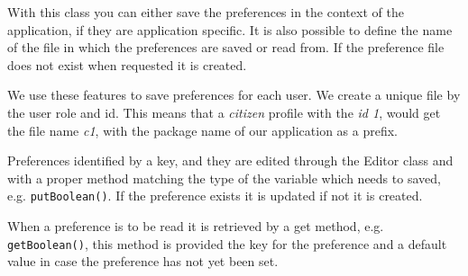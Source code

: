 With this class you can either save the preferences in the context of the application, if they are application specific. It is also possible to define the name of the file in which the preferences are saved or read from. If the preference file does not exist when requested it is created.

We use these features to save preferences for each user. We create a unique file by the user role and id.
This means that a \textit{citizen} profile with the \textit{id 1}, would get the file name \textit{c1}, with the package name of our application as a prefix.

Preferences identified by a key, and they are edited through the Editor class and with a proper method matching the type of the variable which needs to saved, e.g. \lstinline!putBoolean()!.
If the preference exists it is updated if not it is created.

When a preference is to be read it is retrieved by a get method, e.g. \lstinline!getBoolean()!, this method is provided the key for the preference and a default value in case the preference has not yet been set.
